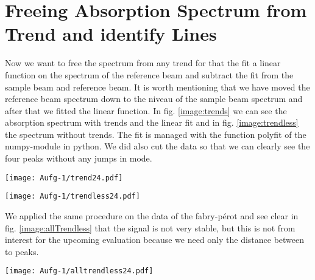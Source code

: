 
\section{Freeing Absorption Spectrum from Trend and identify Lines}
\label{sec:freeing}
Now we want to free the spectrum from any trend for that the fit a linear function on the spectrum of the reference beam and subtract the fit from the sample beam and reference beam. It is worth mentioning that we have moved the reference beam spectrum down to the niveau of the sample beam spectrum and after that we fitted the linear function. In fig. \ref{image:trends} we can see the absorption spectrum with trends and the linear fit and in fig. \ref{image:trendless} the spectrum without trends. The fit is managed with the function polyfit of the numpy-module in python. We did also cut the data so that we can clearly see the four peaks without any jumps in mode.
\begin{center}
    \texttt{[image: Aufg-1/trend24.pdf]}
    \label{image:trends}
\end{center}
\begin{center}
    \texttt{[image: Aufg-1/trendless24.pdf]}
    \label{image:trendless}
\end{center}
We applied the same procedure on the data of the fabry-pérot and see clear in fig. \ref{image:allTrendless} that the signal is not very stable, but this is not from interest for the upcoming evaluation because we need only the distance between to peaks.
\begin{center}
    \texttt{[image: Aufg-1/alltrendless24.pdf]}
    \label{image:allTrendless}
\end{center}
